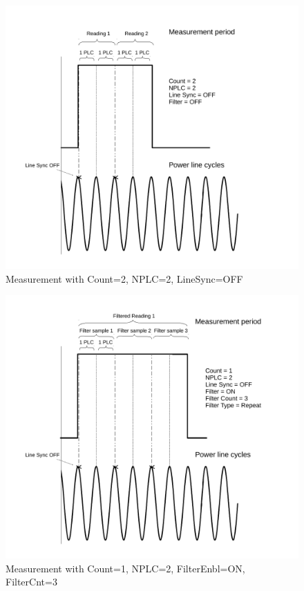 \documentclass[openany]{article}
\begin{document}
		\begin{figure}[!h]
			\caption{Measurement with Count=2, NPLC=2, LineSync=OFF}
			\label{fig:meas-param2}
			\centering
			\includegraphics[width=1.0\textwidth]{dcct-meas-param2-image}
		\end{figure}

		\begin{figure}[!h]
			\caption{Measurement with Count=1, NPLC=2, FilterEnbl=ON, FilterCnt=3}
			\label{fig:meas-param3}
			\centering
			\includegraphics[width=1.0\textwidth]{dcct-meas-param3-image}
		\end{figure}
\FloatBarrier
\end{document}
